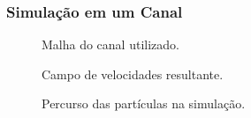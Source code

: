 \documentclass{beamer}
\begin{document}
\begin{frame}
  \frametitle{Simulação em um Canal}
  
  \begin{figure}
     {\raggedleft \tiny Malha do canal utilizado.}
  \end{figure}
  \vspace*{-\baselineskip}\setlength\belowdisplayshortskip{0pt} %
  \begin{figure}
     {\raggedleft \tiny Campo de velocidades resultante.}
  \end{figure}
  \vspace*{-\baselineskip}\setlength\belowdisplayshortskip{0pt} %
  \begin{figure}
     {\raggedleft \tiny Percurso das partículas na simulação.}
  \end{figure}
\end{frame}

\end{document}
